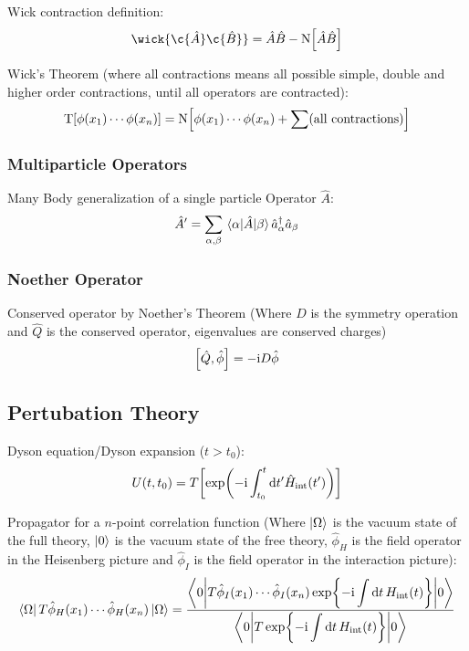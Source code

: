 			\noindent
			Wick contraction definition:
			\begin{equation}
				\wick{\c{\hat{A}} \c{\hat{B}}} = \hat{A}\hat{B} - \NormalOrder{\hat{A}\hat{B}}
			\end{equation}

			\noindent
			Wick's Theorem (where all contractions means all possible simple, double and higher order contractions, until all operators are contracted):
			\begin{equation}
				\mathrm{T}\qty[\phi(x_1)\dotsb\phi(x_n)] = \mathrm{N}\qty[\phi(x_1)\dotsb\phi(x_n) + \sum(\text{all contractions})]
			\end{equation}
			
		\subsubsection{Multiparticle Operators}
			Many Body generalization of a single particle Operator $\hat{A}$:
			\begin{equation}
				\hat{A}' = \sum_{\alpha,\beta} \mel{\alpha}{\hat{A}}{\beta} \hat{a}_\alpha^\dagger \hat{a}_\beta
			\end{equation}

		\subsubsection{Noether Operator}
			\noindent
			Conserved operator by Noether's Theorem (Where $D$ is the symmetry operation and $\hat{Q}$ is the conserved operator, \ie eigenvalues are conserved charges)
			\begin{equation}
				\comm{\hat{Q}}{\hat{\phi}} = -\i D\hat{\phi}
			\end{equation}
			
	\subsection{Pertubation Theory}
		Dyson equation/Dyson expansion ($t > t_0$):
		\begin{equation}
			U(t,t_0) = T \qty[ \exp(-\mathrm{i} \int_{t_0}^t \dd t' \hat{H}_{\mathrm{int}}(t')) ]
		\end{equation}

		\noindent
		Propagator for a $n$-point correlation function (Where $\Ket{\Omega}$ is the vacuum state of the full theory, $\Ket{0}$ is the vacuum state of the free theory, $\hat{\phi}_H$ is the field operator in the Heisenberg picture and $\hat{\phi}_I$ is the field operator in the interaction picture):
		\begin{equation}
			\Bra{\Omega} T \hat{\phi}_H(x_1) \dotsb \hat{\phi}_H(x_n) \Ket{\Omega}
			= \frac{ \mel**{0}{T \hat{\phi}_I(x_1) \dotsb \hat{\phi}_I(x_n) \exp{-\mathrm{i}\displaystyle\int \dd t \, H_{\mathrm{int}}(t)}}{0}}
			{\mel**{0}{T\exp{-\mathrm{i}\displaystyle\int \dd t \, H_{\mathrm{int}}(t)}}{0}}
		\end{equation}

